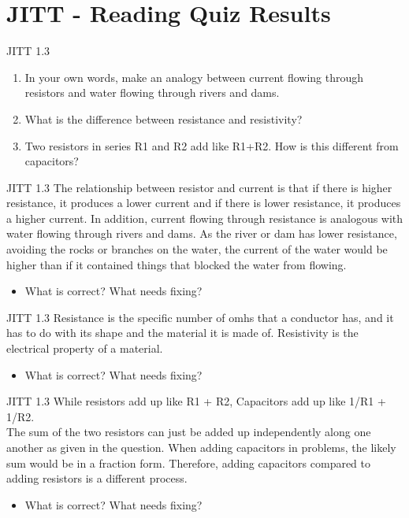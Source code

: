 \documentclass{beamer}
\begin{document}
\section{JITT - Reading Quiz Results}

\begin{frame}{JITT 1.3}
\begin{enumerate}
\item In your own words, make an analogy between current flowing through resistors and water flowing through rivers and dams.
\item What is the difference between resistance and resistivity?
\item Two resistors in series R1 and R2 add like R1+R2.  How is this different from capacitors?
\end{enumerate}
\end{frame}

\begin{frame}{JITT 1.3}
The relationship between resistor and current is that if there is higher resistance, it produces a lower current and if there is lower resistance, it produces a higher current.  In addition, current flowing through resistance is analogous with water flowing through rivers and dams. As the river or dam has lower resistance, avoiding the rocks or branches on the water, the current of the water would be higher than if it contained things that blocked the water from flowing.
\begin{itemize}
\item What is correct?  What needs fixing?
\end{itemize}
\end{frame}

\begin{frame}{JITT 1.3}
Resistance is the specific number of omhs that a conductor has, and it has to do with its shape and the material it is made of. Resistivity is the electrical property of a material.
\begin{itemize}
\item What is correct?  What needs fixing?
\end{itemize}
\end{frame}

\begin{frame}{JITT 1.3}
While resistors add up like R1 + R2, Capacitors add up like 1/R1 + 1/R2.  \\ \vspace{0.5cm}
The sum of the two resistors can just be added up independently along one another as given in the question. When adding capacitors in problems, the likely sum would be in a fraction form. Therefore, adding capacitors compared to adding resistors is a different process.  
\begin{itemize}
\item What is correct?  What needs fixing?
\end{itemize}
\end{frame} 
\end{document}
